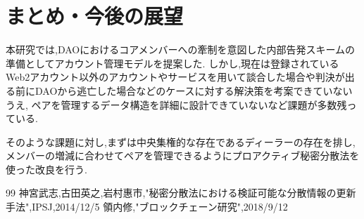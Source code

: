 \documentclass[10pt,twocolumn,a4j]{jarticle}
\begin{document}
\section{\normalsize まとめ・今後の展望}
本研究では,DAOにおけるコアメンバーへの牽制を意図した内部告発スキームの準備としてアカウント管理モデルを提案した.
しかし,現在は登録されているWeb2アカウント以外のアカウントやサービスを用いて談合した場合や判決が出る前にDAOから逃亡した場合などのケースに対する解決策を考案できていないうえ,
ペアを管理するデータ構造を詳細に設計できていないなど課題が多数残っている.

そのような課題に対し,まずは中央集権的な存在であるディーラーの存在を排し,メンバーの増減に合わせてペアを管理できるようにプロアクティブ秘密分散法を使った改良を行う.

\begin {thebibliography}{99}
   神宮武志,古田英之,岩村惠市,"秘密分散法における検証可能な分散情報の更新手法",IPSJ,2014/12/5
   領内修,"ブロックチェーン研究",2018/9/12
\end{thebibliography}
\end{document}
